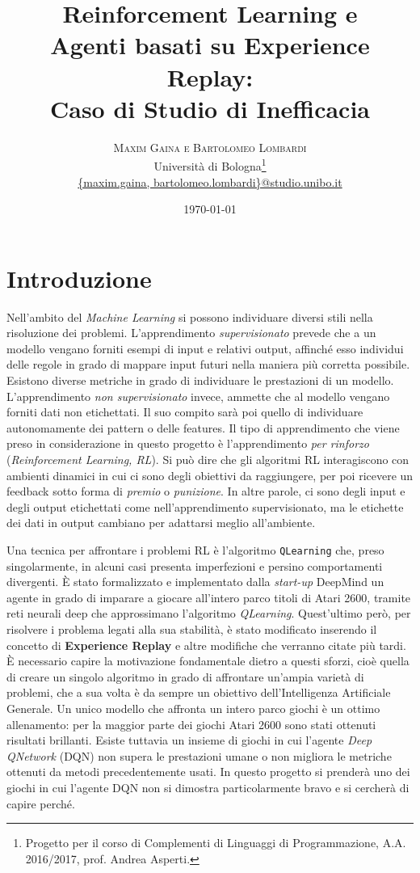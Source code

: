 \documentclass[twoside,twocolumn,10pt]{extarticle}
\title{Reinforcement Learning e\\ Agenti basati su Experience Replay:\\ Caso di Studio di Inefficacia} %
\author{%
\textsc{Maxim Gaina e Bartolomeo Lombardi} \\[1ex] %
\normalsize Università di Bologna\thanks{Progetto per il corso di Complementi di Linguaggi di Programmazione, A.A. 2016/2017, prof. Andrea Asperti.} \\ %
\normalsize \href{mailto:maxim.gaina@studio.unibo.it}{\{maxim.gaina, bartolomeo.lombardi\}@studio.unibo.it}
}
\date{\today} %
\theoremstyle{definition}
\begin{document}
\maketitle

\tableofcontents

\section*{Introduzione}
	\lettrine[nindent = 0.4em,lines=3]{N}\space\MakeTextLowercase{e}ll'ambito del \textit{Machine Learning} si possono individuare diversi stili nella risoluzione dei problemi. L'apprendimento \textit{supervisionato} prevede che a un modello vengano forniti esempi di input e relativi output, affinché esso individui delle regole in grado di mappare input futuri nella maniera più corretta possibile. Esistono diverse metriche in grado di individuare le prestazioni di un modello. L'apprendimento \textit{non supervisionato} invece, ammette che al modello vengano forniti dati non etichettati. Il suo compito sarà poi quello di individuare autonomamente dei pattern o delle features. Il tipo di apprendimento che viene preso in considerazione in questo progetto è l'apprendimento \textit{per rinforzo} (\textit{Reinforcement Learning, RL}). Si può dire che gli algoritmi RL interagiscono con ambienti dinamici in cui ci sono degli obiettivi da raggiungere, per poi ricevere un feedback sotto forma di \textit{premio} o \textit{punizione}. In altre parole, ci sono degli input e degli output etichettati come nell'apprendimento supervisionato, ma le etichette dei dati in output cambiano per adattarsi meglio all'ambiente.
	
	Una tecnica per affrontare i problemi RL è l'algoritmo \texttt{Q\texttwelveudash Learning} che, preso singolarmente, in alcuni casi presenta imperfezioni e persino comportamenti divergenti. È stato formalizzato e implementato dalla \textit{start-up} DeepMind un agente in grado di imparare a giocare all'intero parco titoli di Atari 2600, tramite reti neurali deep che approssimano l'algoritmo \textit{Q\texttwelveudash Learning}. Quest'ultimo però, per risolvere i problema legati alla sua stabilità, è stato modificato inserendo il concetto di \textbf{Experience Replay} e altre modifiche che verranno citate più tardi. È necessario capire la motivazione fondamentale dietro a questi sforzi, cioè quella di creare un singolo algoritmo in grado di affrontare un'ampia varietà di problemi, che a sua volta è da sempre un obiettivo dell'Intelligenza Artificiale Generale. Un unico modello che affronta un intero parco giochi è un ottimo allenamento: per la maggior parte dei giochi Atari 2600 sono stati ottenuti risultati brillanti. Esiste tuttavia un insieme di giochi in cui l'agente \textit{Deep Q\texttwelveudash Network} (DQN) non supera le prestazioni umane o non migliora le metriche ottenuti da metodi precedentemente usati. In questo progetto si prenderà uno dei giochi in cui l'agente DQN non si dimostra particolarmente bravo e si cercherà di capire perché.
	
\end{document}
